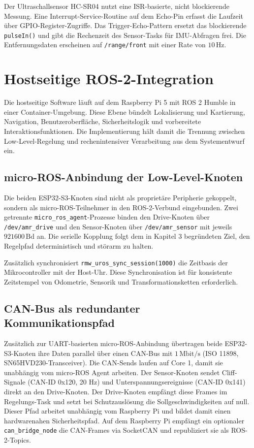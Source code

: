 Der Ultraschallsensor HC-SR04 nutzt eine ISR-basierte, nicht blockierende Messung. Eine Interrupt-Service-Routine auf dem Echo-Pin erfasst die Laufzeit über GPIO-Register-Zugriffe. Das Trigger-Echo-Pattern ersetzt das blockierende \texttt{pulseIn()} und gibt die Rechenzeit des Sensor-Tasks für IMU-Abfragen frei. Die Entfernungsdaten erscheinen auf \texttt{/range/front} mit einer Rate von $10\,\mathrm{Hz}$.

\section{Hostseitige ROS-2-Integration}

Die hostseitige Software läuft auf dem Raspberry Pi 5 mit ROS 2 Humble in einer Container-Umgebung. Diese Ebene bündelt Lokalisierung und Kartierung, Navigation, Benutzeroberfläche, Sicherheitslogik und vorbereitete Interaktionsfunktionen. Die Implementierung hält damit die Trennung zwischen Low-Level-Regelung und rechenintensiver Verarbeitung aus dem Systementwurf ein.

\subsection{micro-ROS-Anbindung der Low-Level-Knoten}

Die beiden ESP32-S3-Knoten sind nicht als proprietäre Peripherie gekoppelt, sondern als micro-ROS-Teilnehmer in den ROS-2-Verbund eingebunden. Zwei getrennte \texttt{micro\_ros\_agent}-Prozesse binden den Drive-Knoten über \texttt{/dev/amr\_drive} und den Sensor-Knoten über \texttt{/dev/amr\_sensor} mit jeweils $921600\,\mathrm{Bd}$ an. Die serielle Kopplung folgt dem in Kapitel 3 begründeten Ziel, den Regelpfad deterministisch und störarm zu halten.

Zusätzlich synchronisiert \texttt{rmw\_uros\_sync\_session(1000)} die Zeitbasis der Mikrocontroller mit der Host-Uhr. Diese Synchronisation ist für konsistente Zeitstempel von Odometrie, Sensorik und Transformationsketten erforderlich.

\subsection{CAN-Bus als redundanter Kommunikationspfad}

Zusätzlich zur UART-basierten micro-ROS-Anbindung übertragen beide ESP32-S3-Knoten ihre Daten parallel über einen CAN-Bus mit $1\,\mathrm{Mbit/s}$ (ISO 11898, SN65HVD230-Transceiver). Die CAN-Sends laufen auf Core 1, damit sie unabhängig vom micro-ROS Agent arbeiten. Der Sensor-Knoten sendet Cliff-Signale (CAN-ID 0x120, 20 Hz) und Unterspannungsereignisse (CAN-ID 0x141) direkt an den Drive-Knoten. Der Drive-Knoten empfängt diese Frames im Regelungs-Task und setzt bei Schutzauslösung die Sollgeschwindigkeiten auf null. Dieser Pfad arbeitet unabhängig vom Raspberry Pi und bildet damit einen hardwarenahen Sicherheitspfad. Auf dem Raspberry Pi empfängt ein optionaler \texttt{can\_bridge\_node} die CAN-Frames via SocketCAN und republiziert sie als ROS-2-Topics.

